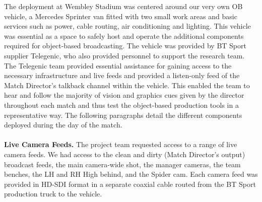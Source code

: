 \documentclass[sigchi-a, authorversion]{acmart}
\begin{document}

The deployment at Wembley Stadium was centered around our very own OB vehicle, a
Mercedes Sprinter van fitted with two small work areas and basic services
such as power, cable routing, air conditioning and lighting. This vehicle was
essential as a space to safely host and operate the additional components
required for object-based broadcasting. The vehicle was provided by BT Sport
supplier Telegenic, who also provided personnel to support the research team.
The Telegenic team provided essential assistance for gaining access to the
necessary infrastructure and live feeds and provided a listen-only feed of the
Match Director's talkback channel within the vehicle. This enabled the team to
hear and follow the majority of vision and graphics cues given by the director throughout each match and thus
test the object-based production tools in a representative way.
The following paragraphs detail the different components deployed during the day
of the match.
\\\\
\textbf{Live Camera Feeds.} The project team requested access to a range of live
camera feeds. We had access to the clean and dirty (Match Director's output)
broadcast feeds, the main camera-wide shot, the manager cameras, the team
benches, the LH and RH High behind, and the Spider cam. Each camera feed was
provided in HD-SDI format in a separate coaxial cable routed from the BT Sport
production truck to the vehicle.
\end{document}
